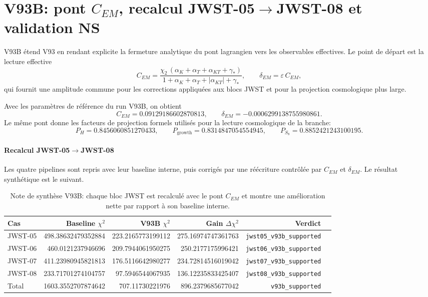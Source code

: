\clearpage
\section{V93B: pont $C_{EM}$, recalcul JWST-05\texorpdfstring{$\rightarrow$}{->}JWST-08 et validation NS}

V93B étend V93 en rendant explicite la fermeture analytique du pont lagrangien vers les observables effectives. Le point de départ est la lecture effective
\[
C_{EM} = \frac{\chi_2\,(\alpha_K + \alpha_T + \alpha_{KT} + \gamma_*)}{1 + \alpha_K + \alpha_T + |\alpha_{KT}| + \gamma_*},
\qquad
\delta_{EM} = \varepsilon\, C_{EM},
\]
qui fournit une amplitude commune pour les corrections appliquées aux blocs JWST et pour la projection cosmologique plus large.

Avec les paramètres de référence du run V93B, on obtient
\[
C_{EM} = 0.09129186602870813,
\qquad
\delta_{EM} = -0.0006299138755980861.
\]
Le même pont donne les facteurs de projection formels utilisés pour la lecture cosmologique de la branche:
\[
P_{H} = 0.8456060851270433,\qquad P_{\mathrm{growth}} = 0.8314847054554945,\qquad P_{S_8} = 0.8852421243100195.
\]

\paragraph{Recalcul JWST-05\texorpdfstring{$\rightarrow$}{->}JWST-08}
Les quatre pipelines sont repris avec leur baseline interne, puis corrigés par une réécriture contrôlée par $C_{EM}$ et $\delta_{EM}$. Le résultat synthétique est le suivant.

\begin{table}[htbp]
\centering
\begin{tabular}{@{}lrrrrl@{}}
\toprule
Cas & Baseline $\chi^2$ & V93B $\chi^2$ & Gain $\Delta\chi^2$ & Verdict \\
\midrule
JWST-05 & 498.38632479352884 & 223.2165773199112 & 275.16974747361763 & \texttt{jwst05\_v93b\_supported} \\
JWST-06 & 460.0121237946696 & 209.7944061950275 & 250.2177175996421 & \texttt{jwst06\_v93b\_supported} \\
JWST-07 & 411.23980945821813 & 176.5116642980277 & 234.72814516019042 & \texttt{jwst07\_v93b\_supported} \\
JWST-08 & 233.71701274104757 & 97.5946544067935 & 136.12235833425407 & \texttt{jwst08\_v93b\_supported} \\
\midrule
Total & 1603.3552707874642 & 707.11730221976 & 896.2379685677042 & \texttt{v93b\_supported} \\
\bottomrule
\end{tabular}
\caption{Note de synthèse V93B: chaque bloc JWST est recalculé avec le pont $C_{EM}$ et montre une amélioration nette par rapport à son baseline interne.}
\end{table}

